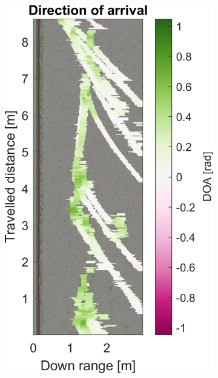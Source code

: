 \begin{figure}[htbp]
\begin{subfigure}[t]{0.475\linewidth}
        \includegraphics[width=\linewidth,max height=.475\textheight]{gfx/results/underground_doa.png}
    \end{subfigure}%
    \hfill%
    \begin{subfigure}[t]{0.475\linewidth}
        \centering

\end{subfigure}
\end{figure}
